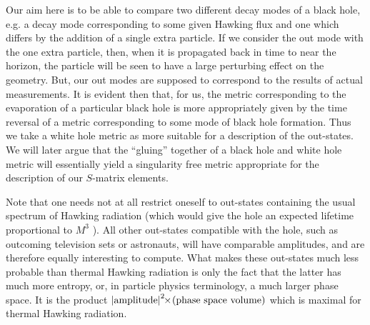\endinsert
Our aim here is
to be able to compare two different decay modes of a black hole, e.g. a
decay mode corresponding to some given Hawking flux and one which
differs by the addition of a single extra particle. If we consider the
out mode with the one extra particle, then, when it is propagated back
in time to near the horizon, the particle will be seen to have a large
perturbing effect on the geometry. But, our out modes
are supposed to correspond to the results of actual measurements. It is
evident then that, for us, the metric corresponding to the evaporation
of a particular black hole is more appropriately given by the time
reversal of a metric corresponding to some mode of black hole
formation. Thus we take a white hole metric as more suitable for a
description of the out-states. We will later argue that the ``gluing''
together of a black hole and white hole metric will essentially yield a
singularity free metric appropriate for the description of our
$S$-matrix elements.

Note that one needs not at all restrict oneself to out-states
containing the usual spectrum of Hawking radiation (which would give
the hole an expected lifetime proportional to $M^3$ ). All other
out-states compatible with the hole, such as outcoming television sets
or astronauts, will have comparable amplitudes, and are therefore
equally interesting to compute. What makes these out-states much less
probable than thermal Hawking radiation is only the fact that the
latter has much more entropy, or, in particle physics terminology, a
much larger phase space. It is the product $\left|{\rm
amplitude}\right|^2\!\!\times\!{\rm (phase~space~volume)}$ which is
maximal for thermal Hawking radiation.

